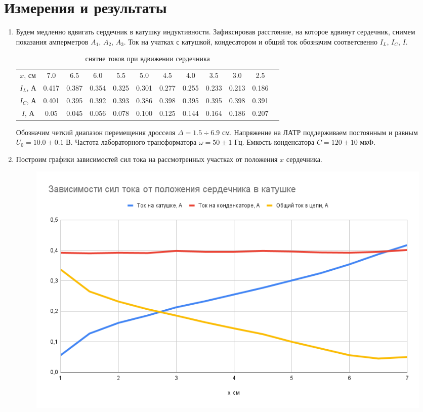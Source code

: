 \documentclass[a4paper, 12pt]{article}
\begin{document}
\section*{Измерения и результаты}
\begin{enumerate}
    \item Будем медленно вдвигать сердечник в катушку индуктивности. Зафиксировав расстояние, на которое вдвинут сердечник, снимем показания
    амперметров $A_{1}$, $A_{2}$, $A_{3}$. Ток на учатках с катушкой, кондесатором и общий ток обозначим соответсвенно $I_{L}$, $I_{C}$, $I$.
    \begin{table}[htbp]
        \centering
        \begin{tabular}{|c|c|c|c|c|c|c|c|c|c|c|c|}
            \hline
            $x$, см & 7.0 & 6.5 & 6.0 & 5.5 & 5.0 & 4.5 & 4.0 & 3.5 & 3.0 & 2.5 \\
            $I_{L}$, А & 0.417 & 0.387 & 0.354 & 0.325 & 0.301 & 0.277 & 0.255 & 0.233 & 0.213 & 0.186 \\
            $I_{C}$, А & 0.401 & 0.395 & 0.392 & 0.393 & 0.386 & 0.398 & 0.395 & 0.395 & 0.398 & 0.391 \\
            $I$, А & 0.05 & 0.045 & 0.056 & 0.078 & 0.100 & 0.125 & 0.144 & 0.164 & 0.186 & 0.207 \\
            \hline
        \end{tabular}
        \caption{снятие токов при вдвижении сердечника}
        \label{снятие токов при вдвижении сердечника}
    \end{table}\newline
    Обозначим четкий диапазон перемещения дросселя $\Delta = 1.5 \div 6.9$ см.
    Напряжение на ЛАТР поддерживаем постоянным и равным $U_{0} = 10.0 \pm 0.1$ В.
    Частота лабораторного трансформатора $\omega = 50\pm 1$ Гц.
    Емкость конденсатора $C = 120\pm 10$ мкФ.
    \newpage
    \item Построим графики зависимостей сил тока на рассмотренных участках от положения $x$ сердечника.
    \begin{figure}[htbp]
        \centering
        \includegraphics[width=0.7\linewidth]{I_x.png}

\end{figure}
\end{enumerate}
\end{document}
